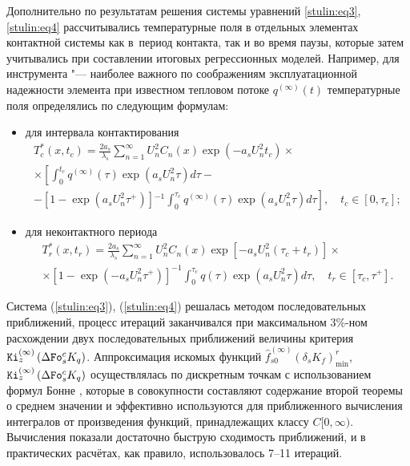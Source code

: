 Дополнительно по результатам решения системы уравнений
\eqref{stulin:eq3}, \eqref{stulin:eq4} рассчитывались температурные поля в отдельных элементах контактной системы как в~период контакта, так и во время паузы, которые затем учитывались при составлении итоговых регрессионных моделей. Например, для инструмента "--- наиболее важного по соображениям эксплуатационной
надежности элемента при известном тепловом потоке $q^{(\infty )}(t)$ температурные поля определялись по следующим формулам:
\begin{itemize}
\item[а)] для интервала контактирования 
\begin{multline}
\label{stulin:eq5}
 T_c^\ast (x,t_c )=\frac{2a_s}{\lambda _s}\sum\limits_{n=1}^\infty U_n^2
C_n (x)\exp (-a_s U_n^2 t_c ) \times \\ \times 
\left[  \int_0^{t_c } q^{(\infty )}(\tau ) \right.\exp \left (a_s U_n^2 \tau \right)d\tau - \\
 -\left[ 1-\exp \left(a_s U_n^2 \tau ^+ \right) \right]\left.
^{-1} \int_0^{\tau _c } q^{(\infty )}(\tau )\exp \left(a_s
U_n^2 \tau \right)d\tau  \right], \quad t_c \in [0,\tau _c ];
\end{multline}

\item[б)] для неконтактного периода 
\begin{multline}
\label{stulin:eq6} T_r^\ast (x,t_r )=\frac{2a_s }{\lambda _s
}\sum\limits_{n=1}^\infty U_n^2 C_n (x)\exp \left[ -a_s U_n^2 \left( \tau _c +t_r  \right)\right]
\times \\
 \times 
\left[
1-\exp (-a_s U_n^2 \tau ^+) \right]^{-1} \int_0^{\tau _c } q(\tau )\exp \left(a_s U_n^2 \tau
 \right)d\tau,
\quad t_r \in [\tau _c ,\tau ^+].
\end{multline}

\end{itemize}


Система (\ref{stulin:eq3}), (\ref{stulin:eq4}) решалась методом
последовательных приближений, процесс итераций заканчивался при
максимальном 3\%-ном расхождении двух последовательных приближений
величины критерия ${\tt Ki}_z^{(\infty )} \left(\Delta {\tt Fo}_s^c K_q
\right)$. Аппроксимация искомых функций $\hat {f}_{s0}^{(\infty )}
(\delta _s K_f )_{\min}^r$, ${\tt Ki}_z^{(\infty )} \left( \Delta {\tt Fo}_s^c
K_q  \right)$ осуществлялась по дискретным точкам с использованием
формул Бонне \cite{stulin:bib10}, которые в совокупности
составляют содержание второй теоремы о среднем значении и
эффективно используются для приближенного вычисления интегралов от
произведения функций, принадлежащих классу $C [0,\infty )$.
Вычисления показали достаточно быструю сходимость приближений, и
в практических расчётах, как правило, использовалось 7--11 итераций.

